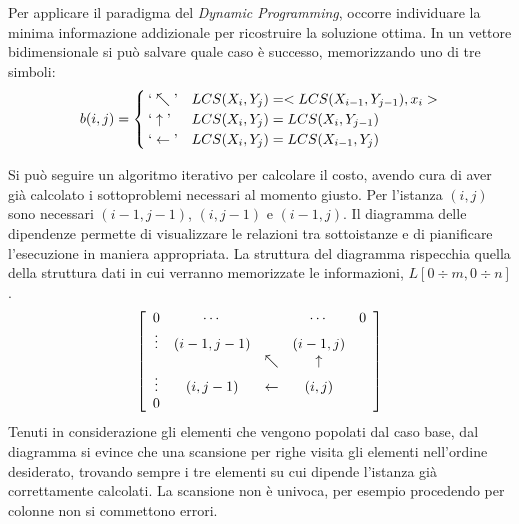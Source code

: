 Per applicare il paradigma del \emph{Dynamic Programming}, occorre individuare la minima informazione addizionale per ricostruire la soluzione ottima.
In un vettore bidimensionale si può salvare quale caso è successo, memorizzando uno di tre simboli:
\begin{equation*}
    b(i,j) = 
    \begin{cases}
        ` \nwarrow \textrm{'}
        &
        LCS(X_i, Y_j)
        = < LCS(X_{i-1}, Y_{j-1}), x_i >
        \\
        ` \uparrow \textrm{'}
        &
        LCS(X_i, Y_j)
        = LCS(X_{i}, Y_{j-1})
        \\
        ` \leftarrow \textrm{'} 
        &
        LCS(X_i, Y_j)
        = LCS(X_{i-1}, Y_{j})
    \end{cases}
\end{equation*}

Si può seguire un algoritmo iterativo per calcolare il costo, avendo cura di aver già calcolato i sottoproblemi necessari al momento giusto. Per l'istanza $(i,j)$ sono necessari $(i-1,j-1)$, $(i,j-1)$ e $(i-1,j)$. Il diagramma delle dipendenze permette di visualizzare le relazioni tra sottoistanze e di pianificare l'esecuzione in maniera appropriata. La struttura del diagramma rispecchia quella della struttura dati in cui verranno memorizzate le informazioni, $L\left[ 0 \div m, 0\div n \right]$.
\begin{equation*}
    \left[ 
    \begin{array}[H]{ccccc}
        0 & \cdots & & \cdots & 0 \\
        \vdots & (i-1,j-1) & & (i-1,j) & \\
        & & \nwarrow & \uparrow & \\
        \vdots & (i,j-1) & \leftarrow & (i,j) & \\
        0 &&&&\\
    \end{array}
    \right]
\end{equation*}
Tenuti in considerazione gli elementi che vengono popolati dal caso base, dal diagramma si evince che una scansione per righe visita gli elementi nell'ordine desiderato, trovando sempre i tre elementi su cui dipende l'istanza già correttamente calcolati. La scansione non è univoca, per esempio procedendo per colonne non si commettono errori.

